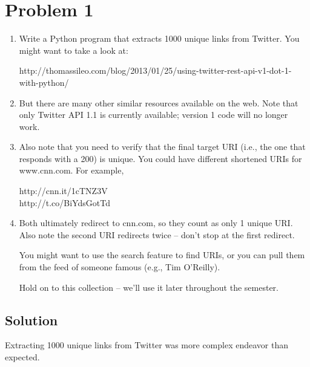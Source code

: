  


\section{Problem 1}
\label{part1}
\begin{enumerate}
\item Write a Python program that extracts 1000 unique links from
Twitter.  You might want to take a look at:

http://thomassileo.com/blog/2013/01/25/using-twitter-rest-api-v1-dot-1-with-python/

\item But there are many other similar resources available on the web.  Note
that only Twitter API 1.1 is currently available; version 1 code will
no longer work.

\item Also note that you need to verify that the final target URI (i.e., the
one that responds with a 200) is unique.  You could have different
shortened URIs for www.cnn.com.  For example, 

http://cnn.it/1cTNZ3V\\
http://t.co/BiYdsGotTd

\item Both ultimately redirect to cnn.com, so they count as only 1 unique URI.
Also note the second URI redirects twice -- don't stop at the first
redirect.

You might want to use the search feature to find URIs, or you can
pull them from the feed of someone famous (e.g., Tim O'Reilly).

Hold on to this collection -- we'll use it later throughout the semester.
\end{enumerate}

\subsection{Solution}

Extracting 1000 unique links from Twitter was more complex endeavor than expected. 

